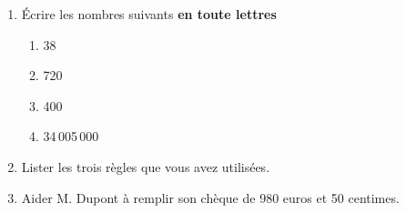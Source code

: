 \documentclass[activite]{thedocument}
\begin{document}
    \begin{enumerate}
        \item Écrire les nombres suivants {\bfseries en toute lettres}
        \begin{enumerate}
            \item 38\dotedline
            \item 720\dotedline
            \item 400\dotedline
            \item 34\,005\,000\dotedline
        \end{enumerate}
        \item Lister les trois règles que vous avez utilisées.
        \dotedline
        \item Aider M. Dupont à remplir son chèque de 980 euros et 50 centimes.
    \end{enumerate}
\end{document}
